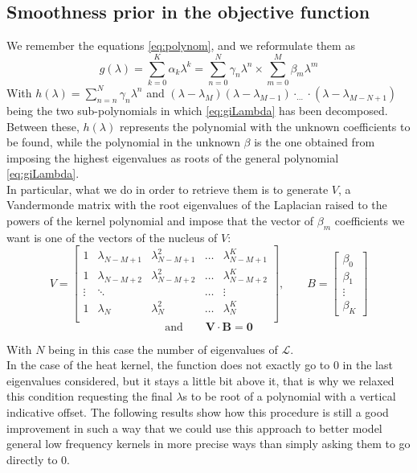 \subsection{Smoothness prior in the objective function}
We remember the equations \ref{eq:polynom}, and we reformulate them as
\begin{equation}
  g(\lambda) = \sum_{k=0}^K\alpha_k \lambda^k = \sum_{n=0}^N\gamma_n \lambda^n \times \sum_{m=0}^M  \beta_m \lambda^m
  \label{eq:giLambda}
\end{equation}
With $h(\lambda) = \sum_{n=n}^N \gamma_n \lambda^n$ and $(\lambda - \lambda_M)(\lambda - \lambda_{M-1})\cdot_{\dots}\cdot (\lambda - \lambda_{M - N +1})$ being the two sub-polynomials in which \autoref{eq:giLambda} has been decomposed. Between these, $h(\lambda)$ represents the polynomial with the unknown coefficients to be found, while the polynomial in the unknown $\beta$ is the one obtained from imposing the highest eigenvalues as roots of the general polynomial \ref{eq:giLambda}.\\
In particular, what we do in order to retrieve them is to generate $V$, a Vandermonde matrix with the root eigenvalues of the Laplacian raised to the powers of the kernel polynomial and impose that the vector of $\beta_m$ coefficients we want is one of the vectors of the nucleus of $V$:
\begin{equation}
  V=
  \begin{bmatrix}
    1 & \lambda_{N-M+1} & \lambda_{N-M+1}^2 & \dots & \lambda_{N-M+1}^K\\
    1 & \lambda_{N-M+2} & \lambda_{N-M+2}^2 & \dots & \lambda_{N-M+2}^K\\
    \vdots & \ddots     &                   & \dots & \vdots\\
    1 & \lambda_N &       \lambda_N^2       & \dots & \lambda_N^K\\
  \end{bmatrix}
  , \qquad B=
  \begin{bmatrix}
    \beta_0\\
    \beta_1\\
    \vdots\\
    \beta_K
  \end{bmatrix}
\end{equation}
\begin{equation}
  \text{and} \qquad \textbf{V}\cdot \textbf{B} = \textbf{0}
\end{equation}

With $N$ being in this case the number of eigenvalues of $\mathcal{L}$.\\
In the case of the heat kernel, the function does not exactly go to 0 in the last eigenvalues considered, but it stays a little bit above it, that is why we relaxed this condition requesting the final $\lambda$s to be root of a polynomial with a vertical indicative offset. The following results show how this procedure is still a good improvement in such a way that we could use this approach to better model general low frequency kernels in more precise ways than simply asking them to go directly to 0.

